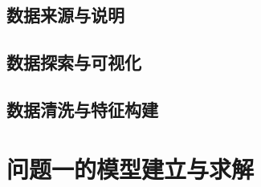 \documentclass[bwprint]{gmcmthesis}
\numberwithin{equation}{section}
\numberwithin{figure}{section}
\numberwithin{table}{section}
\begin{document}
%

\subsection{数据来源与说明}

\subsection{数据探索与可视化}

\subsection{数据清洗与特征构建}


\clearpage
\section{问题一的模型建立与求解}

\end{document}
